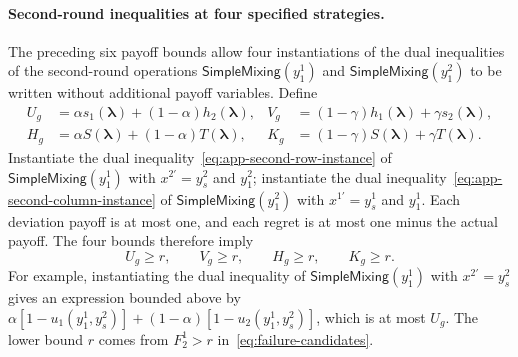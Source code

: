 \documentclass[11pt]{article}
\theoremstyle{remark}
\theoremstyle{plain}
\newcommand{\sm}{\mathsf{SimpleMixing}}
\begin{document}
\paragraph{Second-round inequalities at four specified strategies.}
The preceding six payoff bounds allow four instantiations of the
dual inequalities of the second-round operations $\sm(y_1^1)$ and
$\sm(y_1^2)$ to be written without additional payoff variables. Define
\begin{equation}
 \begin{aligned}
 U_g&=\alpha s_1(\boldsymbol\lambda)+(1-\alpha)h_2(\boldsymbol\lambda),&
 V_g&=(1-\gamma)h_1(\boldsymbol\lambda)+\gamma s_2(\boldsymbol\lambda),\\
 H_g&=\alpha S(\boldsymbol\lambda)+(1-\alpha)T(\boldsymbol\lambda),&
 K_g&=(1-\gamma)S(\boldsymbol\lambda)+\gamma T(\boldsymbol\lambda).
 \end{aligned}
 \label{eq:app-weighted-regret-bounds}
\end{equation}
Instantiate the dual inequality~\eqref{eq:app-second-row-instance}
of $\sm(y_1^1)$ with $x^{2\prime}=y_s^2$ and $y_1^2$; instantiate
the dual inequality~\eqref{eq:app-second-column-instance} of
$\sm(y_1^2)$ with $x^{1\prime}=y_s^1$ and $y_1^1$.
Each deviation payoff is
at most one, and each regret is at most one minus the actual
payoff. The four bounds therefore imply
\begin{equation}
 U_g\ge r,\qquad V_g\ge r,\qquad H_g\ge r,\qquad K_g\ge r.
 \label{eq:app-second-round-comparisons}
\end{equation}
For example, instantiating the dual inequality of $\sm(y_1^1)$
with $x^{2\prime}=y_s^2$ gives an expression bounded above by
$\alpha[1-u_1(y_1^1,y_s^2)]+(1-\alpha)[1-u_2(y_1^1,y_s^2)]$,
which is at most $U_g$. The lower bound $r$ comes from
$F_2^1>r$ in~\eqref{eq:failure-candidates}.
\end{document}

